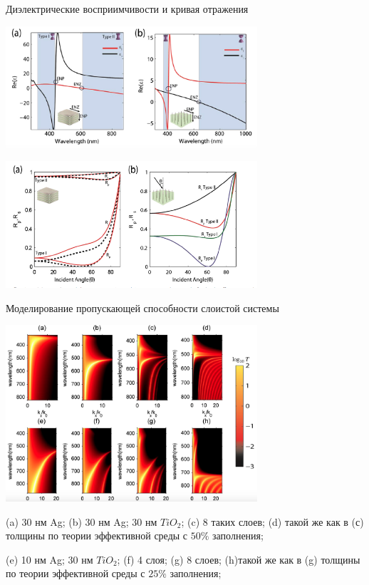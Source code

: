 \documentclass[9pt, compress, xcolor=table]{beamer}
\begin{document}
\begin{frame}{Диэлектрические восприимчивости и кривая отражения}
\begin{center}
\includegraphics[width=0.7\textwidth]{neg_ref_n2}

\includegraphics[width=0.7\textwidth]{neg_ref_n7}
\end{center}
\end{frame}

\begin{frame}{Моделирование пропускающей способности слоистой системы}
\begin{center}
\includegraphics[width=0.7\textwidth]{neg_ref_n3}

(a) 30 нм Ag; (b) 30 нм Ag; 30 нм $TiO_2$; (c) 8 таких слоев; (d) такой же как в (с) толщины по теории эффективной среды с $50\%$ заполнения; 

(e) 10 нм Ag; 30 нм $TiO_2$; (f) 4 слоя; (g) 8 слоев; (h)такой же как в (g) толщины по теории эффективной среды с $25\%$ заполнения;
\end{center}
\end{frame}
\end{document}
